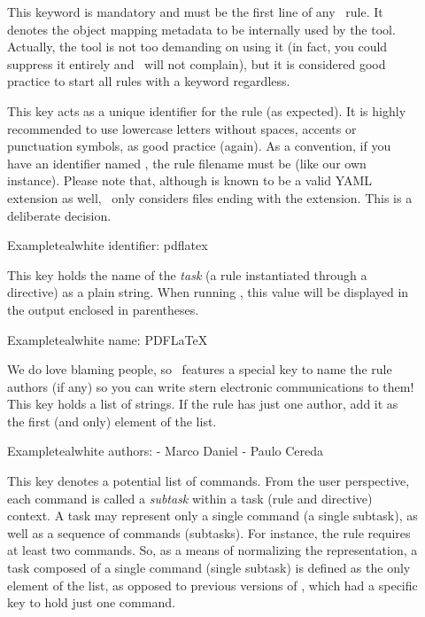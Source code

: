 \begin{description}
\item[] This keyword is mandatory and must be the first line of any \arara\ rule. It denotes the object mapping metadata to be internally used by the tool. Actually, the tool is not too demanding on using it (in fact, you could suppress it entirely and \arara\ will not complain), but it is considered good practice to start all rules with a  keyword regardless.

\item[] This key acts as a unique identifier for the rule (as expected). It is highly recommended to use lowercase letters without spaces, accents or punctuation symbols, as good practice (again). As a convention, if you have an identifier named , the rule filename must be  (like our own instance). Please note that, although  is known to be a valid \gls{YAML} extension as well, \arara\ only considers files ending with the  extension. This is a deliberate decision.

\begin{codebox}{Example}{teal}{\icnote}{white}
identifier: pdflatex
\end{codebox}

\item[] This key holds the name of the \emph{task} (a rule instantiated through a directive) as a plain string. When running \arara, this value will be displayed in the output enclosed in parentheses.

\begin{codebox}{Example}{teal}{\icnote}{white}
name: PDFLaTeX
\end{codebox}

\item[] We do love blaming people, so \arara\ features a special key to name the rule authors (if any) so you can write stern electronic communications to them! This key holds a list of strings. If the rule has just one author, add it as the first (and only) element of the list.

\begin{codebox}{Example}{teal}{\icnote}{white}
authors:
- Marco Daniel
- Paulo Cereda
\end{codebox}

\item[] This key denotes a potential list of commands. From the user perspective, each command is called a \emph{subtask} within a task (rule and directive) context. A task may represent only a single command (a single subtask), as well as a sequence of commands (subtasks). For instance, the  rule requires at least two commands. So, as a means of normalizing the representation, a task composed of a single command (single subtask) is defined as the only element of the list, as opposed to previous versions of \arara, which had a specific key to hold just one command.


\end{description}
